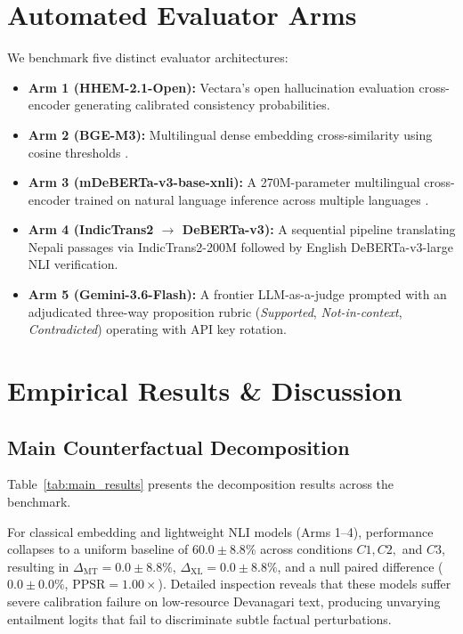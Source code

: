 \documentclass[conference]{IEEEtran}
\begin{document}
\section{Automated Evaluator Arms}
\label{sec:evaluators}
We benchmark five distinct evaluator architectures:
\begin{itemize}
    \item \textbf{Arm 1 (HHEM-2.1-Open):} Vectara's open hallucination evaluation cross-encoder generating calibrated consistency probabilities.
    \item \textbf{Arm 2 (BGE-M3):} Multilingual dense embedding cross-similarity using cosine thresholds \cite{chen2024bgem3}.
    \item \textbf{Arm 3 (mDeBERTa-v3-base-xnli):} A 270M-parameter multilingual cross-encoder trained on natural language inference across multiple languages \cite{laurer2022mdeberta}.
    \item \textbf{Arm 4 (IndicTrans2 $\to$ DeBERTa-v3):} A sequential pipeline translating Nepali passages via IndicTrans2-200M \cite{gala2023indictrans2} followed by English DeBERTa-v3-large NLI verification.
    \item \textbf{Arm 5 (Gemini-3.6-Flash):} A frontier LLM-as-a-judge prompted with an adjudicated three-way proposition rubric (\textit{Supported}, \textit{Not-in-context}, \textit{Contradicted}) operating with API key rotation.
\end{itemize}

\section{Empirical Results \& Discussion}
\label{sec:results}



\subsection{Main Counterfactual Decomposition}
Table~\ref{tab:main_results} presents the decomposition results across the benchmark. 

For classical embedding and lightweight NLI models (Arms 1--4), performance collapses to a uniform baseline of $60.0 \pm 8.8\%$ across conditions $C1, C2,$ and $C3$, resulting in $\Delta_{\text{MT}} = 0.0 \pm 8.8\%$, $\Delta_{\text{XL}} = 0.0 \pm 8.8\%$, and a null paired difference ($0.0 \pm 0.0\%$, $\text{PPSR} = 1.00\times$). Detailed inspection reveals that these models suffer severe calibration failure on low-resource Devanagari text, producing unvarying entailment logits that fail to discriminate subtle factual perturbations.
\end{document}
